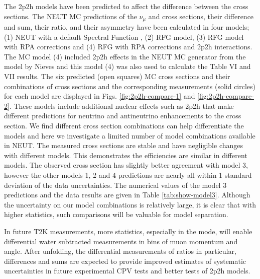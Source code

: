 The 2p2h models have been predicted \citep{martini-2} 
to affect the difference between the
\nuandnubar cross sections. The NEUT MC predictions
of the $\nu_\mu$ and \nubar cross sections, their difference and sum,
their ratio, and their asymmetry have been calculated in four models; 
(1) NEUT with a default Spectral Function \citep{sfmodel}, %
(2) RFG model, %
(3) RFG model with RPA corrections  and  %
(4) RFG with RPA corrections and 2p2h interactions. 
The MC model (4) included
 2p2h effects in the NEUT MC generator from the model by 
Nieves \citep{nieves-1} and this model (4)
was also used to calculate the Table VI and VII results.
The six predicted (open squares) MC cross sections and their combinations of cross sections 
and 
the corresponding measurements (solid circles) for each model are displayed in 
Figs. \ref{fig:2p2h-compare-1} and \ref{fig:2p2h-compare-2}.
These models include additional nuclear effects such as 2p2h that make 
different predictions for neutrino and antineutrino enhancements to the cross section. 
We find different cross section combinations can help differentiate
the models and here we investigate a limited number of model combinations 
available in NEUT.
The measured cross sections are stable and have negligible changes with different models.
This demonstrates the efficiencies are similar in different models.
The observed \nubar cross section has slightly better agreement with model 3,
however the other models 1, 2 and 4 predictions are nearly all  
within 1 standard deviation of the data uncertainties. The numerical values of
the model 3 predictions and the data results are given in Table \ref{tab:show-model3}.
Although the uncertainty on our model combinations is relatively large, it is clear that 
with higher statistics, such comparisons will be valuable for model separation.

In future T2K measurements, more statistics, especially in the \nubar
mode, will enable differential water subtracted measurements in bins
of muon momentum and angle. After unfolding, the differential measurements
of ratios in particular, differences and sums are expected to provide improved estimates of
systematic uncertainties in future experimental CPV tests and better
tests of 2p2h models.%